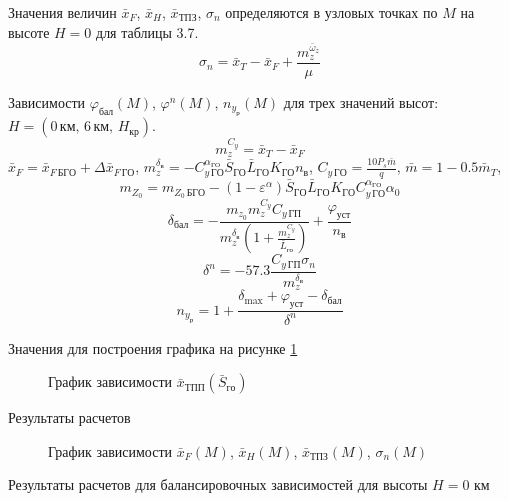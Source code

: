 Значения величин $\bar{x}_F$, $\bar{x}_H$, $\bar{x}_{ТПЗ}$, $\sigma_n$ определяются в
узловых точках по $M$ на высоте $H=0$ для таблицы 3.7.
\[
    \sigma_n = \bar{x}_{T} - \bar{x}_{F} + \frac{m_z^{\bar{\omega}_z}}{\mu}
\]

Зависимости $\varphi_{бал}(M)$, $\varphi^n(M)$, $n_{y_р}(M)$ для трех значений
высот: $H=(0 \, км,\, 6 \, км,\, H_{кр})$.
\[
    m_z^{C_y} = \bar{x}_T - \bar{x}_F
\]
$\bar{x}_{F} = \bar{x}_{F\, БГО} + \Delta \bar{x}_{F\, ГО}$, $m_z^{\delta_в} = 
-C_{y\, {ГО}}^{\alpha_{ГО}} \bar{S}_{ГО} \bar{L}_{ГО} K_{ГО} n_в$, $C_{y\, {ГО}}
= \frac{10 P_s \bar{m}}{q}$, $\bar{m} = 1 - 0.5 \bar{m}_{T}$,
\[
    m_{Z_0} = m_{Z_0\, БГО} - 
    (1-\varepsilon^\alpha)\bar{S}_{ГО} \bar{L}_{ГО} K_{ГО} C_{y\,{ГО}}^{\alpha_{ГО}}
    \alpha_0
\]
\[
    \delta_{бал}  = - \frac{m_{z_0} m_z^{C_y} C_{y\, {ГП}}}{ m_z^{\delta_в}
    \left(1 + \frac{m_z^{C_y}}{\bar{L}_{го}}\right)} + \frac{\varphi_{уст}}{n_в}
\]
\[
    \delta^n = -57.3 \frac{C_{y\, ГП} \sigma_n}{ m_z^{\delta_в}}
\]
\[
    n_{y_р} = 1 + \frac{\delta_{\max} + \varphi_{уст} - \delta_{бал}}{\delta^n}
\]

\begin{table}[H]
    \centering
    \caption{Значения для построения графика на рисунке \ref{fig:xTP}}
    \label{tab:otn_S_go}
    
\end{table}
\begin{figure}[H]
\centering
\resizebox{.79\linewidth}{!}{}
\caption{График зависимости $\bar{x}_{ТПП}(\bar{S}_{го})$} 
\label{fig:xTP}
\end{figure}

\begin{table}[H]
    \centering
    \caption{Результаты расчетов}
    \label{tab:sigmas}
    
\end{table}

\begin{figure}[H]
\centering
\resizebox{.79\linewidth}{!}{}
\caption{График зависимости $\bar{x}_{F}(M)$, $\bar{x}_{H}(M)$, $\bar{x}_{ТПЗ}(M)$, $\sigma_{n}(M)$}
\label{fig:xis_sigma}
\end{figure}


\begin{table}[H]
    \centering
    \caption{Результаты расчетов для балансировочных зависимостей для высоты
    $H=0$ км}
    \label{tab:phi_0}
    
\end{table}

